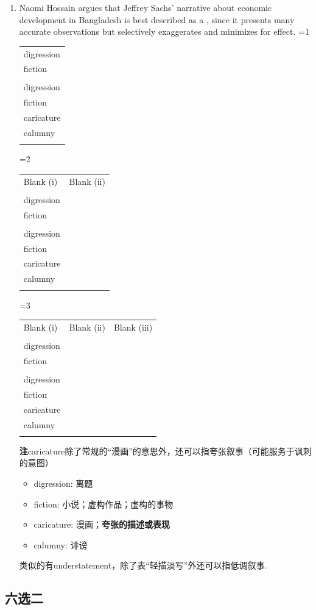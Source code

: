 \documentclass[11pt,space]{ctexart}
\newcommand{\note}[1]{{\heiti\textbf{注\hspace{1em}}}#1.}
\newcommand{\choices}[5]{%
    \ifx\relax#4\relax %
        \begin{tabular}{|>{\centering\arraybackslash}m{0.7\linewidth}|}
        \hline
        #1 \\ 
        \hline
        #2 \\ 
        \hline
        #3 \\
        \hline 
        \end{tabular}
    \else %
        \begin{tabular}{|>{\centering\arraybackslash}m{0.4\linewidth}|}
        \hline
        #1 \\ 
        \hline
        #2 \\ 
        \hline
        #3 \\
        \hline 
        #4 \\ 
        \hline
        #5 \\
        \hline 
        \end{tabular}
    \fi
}
\newcommand{\multiblank}[4]{%
    \ifnum#1=1
        \begin{center}
            \begin{tabularx}{0.4\textwidth}{*{1}{>{\centering\arraybackslash}X}}
            {#2}
            \end{tabularx}
        \end{center}
    \else
        \ifnum#1=2 %
            \begin{center}
                \begin{tabularx}{0.4\textwidth}{*{2}{>{\centering\arraybackslash}X}}
                Blank (i) & Blank (ii) \\
                {#2} & {#3}
                \end{tabularx}
            \end{center}
        \else %
            \ifnum#1=3
                \begin{center}
                    \begin{tabularx}{0.4\textwidth}{*{3}{>{\centering\arraybackslash}X}}
                    Blank (i) & Blank (ii) & Blank (iii) \\
                    {#2} & {#3} & {#4}
                    \end{tabularx}
                \end{center}
            \fi
        \fi
    \fi
}
\begin{document}
\begin{enumerate}
\item Naomi Hossain argues that Jeffrey Sachs' narrative about economic development in Bangladesh is best described as a \blank{}, since it presents many accurate observations but selectively exaggerates and minimizes for effect.
\multiblank{1}{\choices{synopsis}{digression}{fiction}{caricature}{calumny}}{}{}
\note{caricature除了常规的“漫画”的意思外，还可以指夸张叙事（可能服务于讽刺的意图）
\begin{itemize}
    \item digression: 离题
    \item fiction: 小说；虚构作品；虚构的事物
    \item caricature: 漫画；\textbf{夸张的描述或表现}
    \item calumny: 诽谤
\end{itemize}
类似的有understatement，除了表“轻描淡写”外还可以指低调叙事}

\end{enumerate}

\subsection*{六选二}
\end{document}

